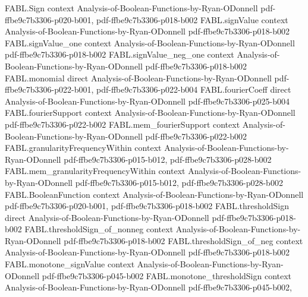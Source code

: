 \begin{theorem}
\label{FABL.majority_monotone}
\leanok
{}
\proofstep
  {FABL.Sign}
  {context}
  {Analysis-of-Boolean-Functions-by-Ryan-ODonnell}
  {pdf-ffbe9c7b3306-p020-b001,
    pdf-ffbe9c7b3306-p018-b002}
\proofstep
  {FABL.signValue}
  {context}
  {Analysis-of-Boolean-Functions-by-Ryan-ODonnell}
  {pdf-ffbe9c7b3306-p018-b002}
\proofstep
  {FABL.signValue_one}
  {context}
  {Analysis-of-Boolean-Functions-by-Ryan-ODonnell}
  {pdf-ffbe9c7b3306-p018-b002}
\proofstep
  {FABL.signValue_neg_one}
  {context}
  {Analysis-of-Boolean-Functions-by-Ryan-ODonnell}
  {pdf-ffbe9c7b3306-p018-b002}
\proofstep
  {FABL.monomial}
  {direct}
  {Analysis-of-Boolean-Functions-by-Ryan-ODonnell}
  {pdf-ffbe9c7b3306-p022-b001,
    pdf-ffbe9c7b3306-p022-b004}
\proofstep
  {FABL.fourierCoeff}
  {direct}
  {Analysis-of-Boolean-Functions-by-Ryan-ODonnell}
  {pdf-ffbe9c7b3306-p025-b004}
\proofstep
  {FABL.fourierSupport}
  {context}
  {Analysis-of-Boolean-Functions-by-Ryan-ODonnell}
  {pdf-ffbe9c7b3306-p022-b002}
\proofstep
  {FABL.mem_fourierSupport}
  {context}
  {Analysis-of-Boolean-Functions-by-Ryan-ODonnell}
  {pdf-ffbe9c7b3306-p022-b002}
\proofstep
  {FABL.granularityFrequencyWithin}
  {context}
  {Analysis-of-Boolean-Functions-by-Ryan-ODonnell}
  {pdf-ffbe9c7b3306-p015-b012,
    pdf-ffbe9c7b3306-p028-b002}
\proofstep
  {FABL.mem_granularityFrequencyWithin}
  {context}
  {Analysis-of-Boolean-Functions-by-Ryan-ODonnell}
  {pdf-ffbe9c7b3306-p015-b012,
    pdf-ffbe9c7b3306-p028-b002}
\proofstep
  {FABL.BooleanFunction}
  {context}
  {Analysis-of-Boolean-Functions-by-Ryan-ODonnell}
  {pdf-ffbe9c7b3306-p020-b001,
    pdf-ffbe9c7b3306-p018-b002}
\proofstep
  {FABL.thresholdSign}
  {direct}
  {Analysis-of-Boolean-Functions-by-Ryan-ODonnell}
  {pdf-ffbe9c7b3306-p018-b002}
\proofstep
  {FABL.thresholdSign_of_nonneg}
  {context}
  {Analysis-of-Boolean-Functions-by-Ryan-ODonnell}
  {pdf-ffbe9c7b3306-p018-b002}
\proofstep
  {FABL.thresholdSign_of_neg}
  {context}
  {Analysis-of-Boolean-Functions-by-Ryan-ODonnell}
  {pdf-ffbe9c7b3306-p018-b002}
\proofstep
  {FABL.monotone_signValue}
  {context}
  {Analysis-of-Boolean-Functions-by-Ryan-ODonnell}
  {pdf-ffbe9c7b3306-p045-b002}
\proofstep
  {FABL.monotone_thresholdSign}
  {context}
  {Analysis-of-Boolean-Functions-by-Ryan-ODonnell}
  {pdf-ffbe9c7b3306-p045-b002,
}
\end{theorem}

